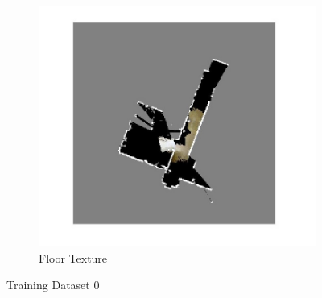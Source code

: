 \documentclass[fleqn,10pt]{SelfArx} %
\begin{document}
\begin{figure}
\begin{subfigure}[t]{0.5\textwidth}
        \includegraphics[scale = 0.5]{set0_tm.jpg}
        \caption{Floor Texture}
    \end{subfigure}
    \caption{Training Dataset 0}
    \label{fig:train0}
\end{figure}
\end{document}
